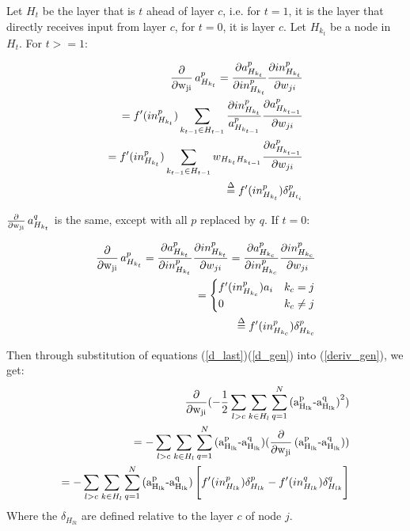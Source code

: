 Let $H_t$ be the layer that is $t$ ahead of layer $c$, i.e. for $t=1$, it is the layer that directly receives input from layer $c$, for $t=0$, it is layer $c$. Let $H_{k_t}$ be a node in $H_t$. For $t>=1$:

\begin{align}
    \Deriv a_{H_{k_t}}^p = \frac{\partial a_{H_{k_t}}^p}{\partial in_{H_{k_t}}^p}\frac{\partial in_{H_{k_t}}^p}{\partial w_{ji}} \\
    = f'(in_{H_{k_t}}^p)\sum_{k_{t-1}\in H_{t-1}} \frac{\partial in_{H_{k_t}}^p}{a_{H_{k_{t-1}}}^p} \frac{\partial a_{H_{k_{t-1}}}^p}{\partial w_{ji}} \\
    = f'(in_{H_{k_t}}^p) \sum_{k_{t-1}\in H_{t-1}} w_{H_{k_t}H_{k_{t-1}}} \frac{\partial a_{H_{k_{t-1}}}^p}{\partial w_{ji}} \\
    \overset{\Delta}{=} f'(in_{H_{k_t}}^p)\delta_{H_{t_i}}^p \label{d_gen}
\end{align}

$\operatorname{\frac{\partial}{\partial w_{ji}}} a_{H_{k_t}}^q$ is the same, except with all $p$ replaced by $q$. If $t=0$:

\begin{align}
    \Deriv a_{H_{k_t}}^p = \frac{\partial a_{H_{k_t}}^p}{\partial in_{H_{k_t}}^p}\frac{\partial in_{H_{k_t}}^p}{\partial w_{ji}} = \frac{\partial a_{H_{k_c}}^p}{\partial in_{H_{k_c}}^p}\frac{\partial in_{H_{k_c}}^p}{\partial w_{ji}} \\
    = 
    \begin{cases}
        f'(in_{H_{k_c}}^p)a_i & k_c = j \\
        0 & k_c \neq j
    \end{cases} \\
    \overset{\Delta}{=} f'(in_{H_{k_c}}^p)\delta_{H_{k_c}}^p \label{d_last}
\end{align}

Then through substitution of equations (\ref{d_last})(\ref{d_gen}) into (\ref{deriv_gen}), we get:
\begin{align}
    \operatorname{\frac{\partial}{\partial w_{ji}}} (-\frac{1}{2}\sum_{l>c}\sum_{k\in H_{l}}\sum_{q=1}^N \operatorname{(a_{H_{lk}}^p - a_{H_{lk}}^q)}^2) \\
    = -\sum_{l>c}\sum_{k\in H_{l}}\sum_{q=1}^N \operatorname{(a_{H_{lk}}^p - a_{H_{lk}}^q)} (\operatorname{\frac{\partial}{\partial w_{ji}}}\operatorname{(a_{H_{lk}}^p - a_{H_{lk}}^q)}) \\
    = -\sum_{l>c}\sum_{k\in H_{l}}\sum_{q=1}^N \operatorname{(a_{H_{lk}}^p - a_{H_{lk}}^q)}  \Bigg[f'(in_{H_{lk}}^p)\delta_{H_{lk}}^p - f'(in_{H_{lk}}^q)\delta_{H_{lk}}^q  \Bigg]
\end{align}
Where the $\delta_{H_{lk}}$ are defined relative to the layer $c$ of node $j$. 
